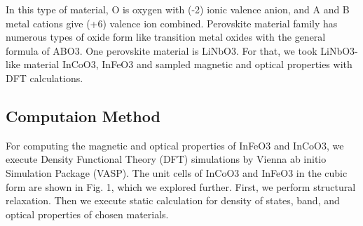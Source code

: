 \documentclass[12pt, letterpaper]{article}
\newcommand*{\1}{\hspace{1pt}}
\begin{document}
    In this type of material, O is oxygen with (-2) ionic valence anion, and A and B metal 
    cations give (+6) valence ion combined. Perovskite material family has numerous types of oxide form like transition metal oxides with the general formula of ABO3.
    One perovskite material is LiNbO3. For that, we took LiNbO3-like material InCoO3, InFeO3 and sampled magnetic and optical properties with DFT calculations. 
    
    \subsection*{Computaion Method}
    For computing the magnetic and optical properties of InFeO3 and InCoO3, we execute Density Functional Theory (DFT) simulations by  Vienna ab initio Simulation 
    Package (VASP). The unit cells of InCoO3 and InFeO3 in the cubic form are shown in Fig. 1, which we explored further. First, we perform structural relaxation. 
    Then we execute static calculation for density of states, band, and optical properties of chosen materials. 
    
%
            
\end{document}
